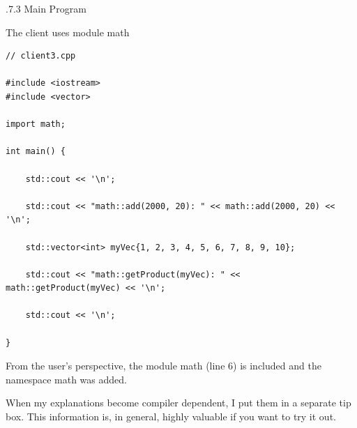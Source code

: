 .7.3\hspace{0.2cm} Main Program

\noindent
The client uses module math
\begin{lstlisting}[style=styleCXX]
// client3.cpp

#include <iostream>
#include <vector>

import math;

int main() {

	std::cout << '\n';
	
	std::cout << "math::add(2000, 20): " << math::add(2000, 20) << '\n';
	
	std::vector<int> myVec{1, 2, 3, 4, 5, 6, 7, 8, 9, 10};
	
	std::cout << "math::getProduct(myVec): " << math::getProduct(myVec) << '\n';
	
	std::cout << '\n';

}
\end{lstlisting}

From the user’s perspective, the module math (line 6) is included and the namespace math was added.

When my explanations become compiler dependent, I put them in a separate tip box. This information is, in general, highly valuable if you want to try it out.



